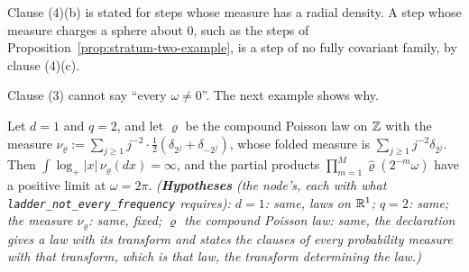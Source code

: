 Clause (4)(b) is stated for steps whose \Levy{} measure has a radial density. A step whose \Levy{}
measure charges a sphere about $0$, such as the steps of Proposition~\ref{prop:stratum-two-example},
is a step of no fully covariant family, by clause (4)(c).

Clause (3) cannot say ``every $\omega \ne 0$''. The next example shows why.

\begin{proposition}
\label{prop:ladder-not-every-frequency}
\leanok
{}
Let $d = 1$ and $q = 2$, and let $\varrho$ be the compound Poisson law on $\mathbb{Z}$ with the \Levy{}
measure $\nu_\varrho := \sum_{j \ge 1}j^{-2}\cdot\tfrac12(\delta_{2^j} + \delta_{-2^j})$, whose folded
\Levy{} measure is $\sum_{j \ge 1}j^{-2}\delta_{2^j}$. Then $\int\log_+|x|\,\nu_\varrho(dx) = \infty$,
and the partial products $\prod_{m=1}^M\widehat\varrho(2^{-m}\omega)$ have a positive limit at
$\omega = 2\pi$.
\statusT\quad\emph{(\textbf{Hypotheses} (the node's, each with what
\texttt{ladder\_not\_every\_frequency} requires): $d = 1$: same, laws on $\mathbb{R}^1$; $q = 2$: same; the
\Levy{} measure $\nu_\varrho$: same, fixed; $\varrho$ the compound Poisson law: same, the
declaration gives a law with its transform and states the clauses of every probability measure
with that transform, which is that law, the transform determining the law.)}
\end{proposition}

